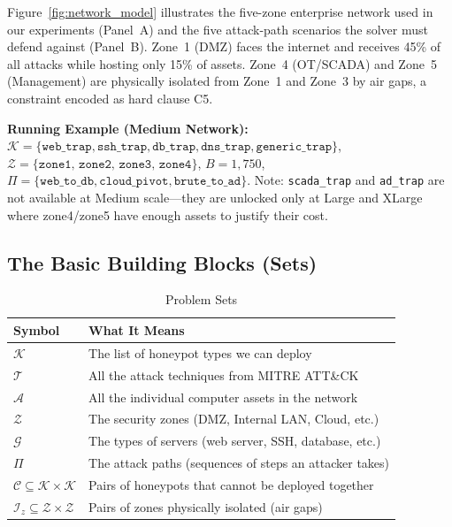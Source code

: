 \documentclass[journal]{IEEEtran}
\newcommand{\calK}{\mathcal{K}}
\newcommand{\calT}{\mathcal{T}}
\newcommand{\calA}{\mathcal{A}}
\newcommand{\calZ}{\mathcal{Z}}
\newcommand{\calG}{\mathcal{G}}
\newcommand{\calC}{\mathcal{C}}
\newcommand{\calPi}{\mathcal{\Pi}}
\begin{document}
Figure~\ref{fig:network_model} illustrates the five-zone
enterprise network used in our experiments (Panel~A) and the
five attack-path scenarios the solver must defend against
(Panel~B).
Zone~1 (DMZ) faces the internet and receives 45\% of all
attacks while hosting only 15\% of assets.
Zone~4 (OT/SCADA) and Zone~5 (Management) are physically
isolated from Zone~1 and Zone~3 by air gaps, a constraint
encoded as hard clause C5.

\begin{examplebox}
\textbf{Running Example (Medium Network):}
$\calK = \{\texttt{web\_trap}, \texttt{ssh\_trap},
\texttt{db\_trap}, \texttt{dns\_trap},
\texttt{generic\_trap}\}$,
$\calZ = \{\texttt{zone1, zone2, zone3, zone4}\}$,
$B = 1{,}750$,
$\calPi = \{\texttt{web\_to\_db}, \texttt{cloud\_pivot},
\texttt{brute\_to\_ad}\}$.
Note: \texttt{scada\_trap} and \texttt{ad\_trap} are not
available at Medium scale---they are unlocked only at Large
and XLarge where zone4/zone5 have enough assets to justify
their cost.
\end{examplebox}

\subsection{The Basic Building Blocks (Sets)}

\begin{table}[htbp]
\caption{Problem Sets}
\label{tab:sets}
\centering
\renewcommand{\arraystretch}{1.2}
\begin{tabular}{@{}ll@{}}
\toprule
\textbf{Symbol} & \textbf{What It Means} \\
\midrule
$\calK$ & The list of honeypot types we can deploy \\
$\calT$ & All the attack techniques from MITRE ATT\&CK \\
$\calA$ & All the individual computer assets in the network \\
$\calZ$ & The security zones (DMZ, Internal LAN, Cloud, etc.) \\
$\calG$ & The types of servers (web server, SSH, database, etc.) \\
$\calPi$ & The attack paths (sequences of steps an attacker takes) \\
$\calC \subseteq \calK \times \calK$ & Pairs of honeypots that cannot be deployed together \\
$\mathcal{I}_z \subseteq \calZ \times \calZ$ & Pairs of zones physically isolated (air gaps) \\
\bottomrule
\end{tabular}
\end{table}
\end{document}
